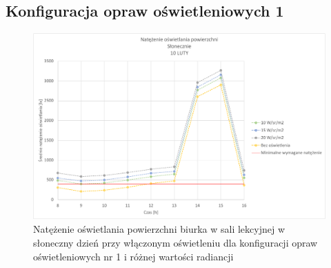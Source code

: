 \documentclass[a4paper,12pt]{article}
\begin{document}
	\subsection{Konfiguracja opraw oświetleniowych 1}
	\label{sec:oswietlenie_1}

	\begin{figure}[ht!]
		\centering
		\includegraphics[scale=0.8]{Wykresy/oswietlenie_1_slonecznie.pdf}
		\caption{Natężenie oświetlania powierzchni biurka w sali lekcyjnej w słoneczny dzień przy włączonym oświetleniu dla konfiguracji opraw oświetleniowych nr 1 i różnej wartości radiancji}
		\label{oswietlenie_1_slonecznie}
	\end{figure}
\end{document}
